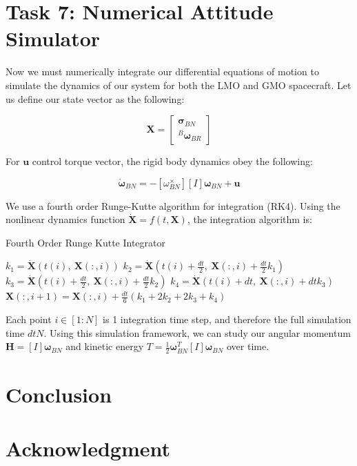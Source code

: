 \documentclass[paper]{aiaaNew}
\begin{document}
\section*{Task 7: Numerical Attitude Simulator}
Now we must numerically integrate our differential equations of motion to simulate the dynamics of our system for both the LMO and GMO spacecraft. Let us define our state vector as the following: 

\begin{equation}
  \bm{X} = \begin{bmatrix}
  \bm{\sigma}_{BN} \\
  ^B\bm{\omega}_{BR}
  \end{bmatrix}
\end{equation}

For $\bm{u}$ control torque vector, the rigid body dynamics obey the following:

\begin{equation}
  [I]\bm{\dot{\omega}}_{BN} = -[\omega_{BN}^\times][I]\bm{\omega}_{BN} + \bm{u}
\end{equation}

We use a fourth order Runge-Kutte algorithm for integration (RK4). Using the nonlinear dynamics function $\dot{\bm{X}} = f(t,\bm{X})$, the integration algorithm is:



\begin{algorithm}
\caption{Fourth Order Runge Kutte Integrator}\label{RK4}
\begin{algorithmic}[1]
    \State $ k_1 = \dot{\bm{X}}(t(i), \ \bm{X}(:,i))$
    \State $ k_2 = \dot{\bm{X}}(t(i)+ \frac{dt}{2}, \  \bm{X}(:,i)+ \frac{dt}{2} k_1)$
    \State $ k_3 = \dot{\bm{X}}(t(i)+ \frac{dt}{2}, \ \bm{X}(:,i)+ \frac{dt}{2} k_2)$
    \State $ k_4 = \dot{\bm{X}}(t(i)+dt,  \ \bm{X}(:,i) + dt k_3)$
    \State $ \bm{X}(:,i+1) =  \bm{X}(:,i) + \frac{dt}{6}(k_1+2k_2+2k_3+k_4)$
\EndFor
\end{algorithmic}
\end{algorithm}

Each point $i \in [1:N]$ is 1 integration time step, and therefore the full simulation time $dtN$. Using this simulation framework, we can study our angular momentum $\bm{H} = [I]\bm{\omega}_{BN}$ and kinetic energy $T = \frac{1}{2} \bm{\omega}_{BN}^T [I] \bm{\omega}_{BN}$ over time.








\section{Conclusion}

\section*{Acknowledgment}

\end{document}
